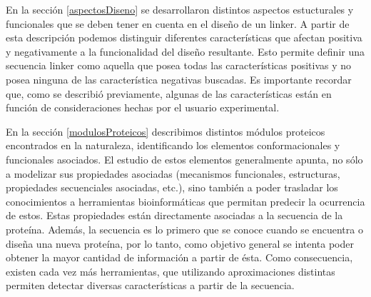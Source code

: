 % 
% 
% 





En la sección \ref{aspectosDiseno} se desarrollaron distintos aspectos estucturales y funcionales que se deben tener en cuenta en el diseño de un linker.
A partir de esta descripción podemos distinguir diferentes características que afectan positiva y negativamente a la funcionalidad del diseño resultante.
Esto permite definir una secuencia linker como aquella que posea todas las características positivas y no posea ninguna de las característica negativas buscadas.
Es importante recordar que, como se describió previamente, algunas de las características están en función de consideraciones hechas por el usuario experimental.

En la sección \ref{modulosProteicos} describimos distintos módulos proteicos encontrados en la naturaleza, identificando los elementos conformacionales y funcionales asociados.
El estudio de estos elementos generalmente apunta, no sólo a modelizar sus propiedades asociadas (mecanismos funcionales, estructuras, propiedades secuenciales asociadas, etc.), 
sino también a poder trasladar los conocimientos a herramientas bioinformáticas que permitan predecir la ocurrencia de estos.
Estas propiedades están directamente asociadas a la secuencia de la proteína. Además, la secuencia es lo primero que se conoce cuando se encuentra o diseña una nueva proteína, por lo tanto,  
como objetivo general se intenta poder obtener la mayor cantidad de información a partir de ésta.
Como consecuencia, existen cada vez más herramientas, que utilizando aproximaciones distintas permiten detectar diversas características a partir de la secuencia.

